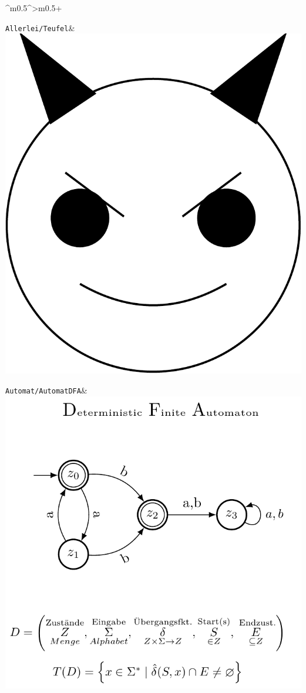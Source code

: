 \documentclass[PLAIN]{Lilly}
\begin{document}
\begin{tabularx}{\linewidth}{^m{0.5\linewidth}^>{\centering\arraybackslash}m{0.5\linewidth}+}
 {}\verb|Allerlei/Teufel|& \includegraphics[width=0.8\linewidth]{Allerlei/Teufel-pdf.pdf}\\
\midrule 
{} {}
 {}\verb|Automat/AutomatDFA|& \includegraphics[width=0.8\linewidth]{Automat/AutomatDFA-pdf.pdf}\\

\end{tabularx}
\end{document}
